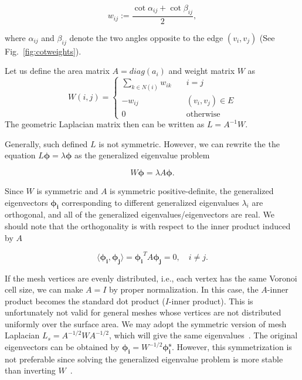 \begin{equation}
w_{ij}:=\frac{\cot\alpha_{ij}+\cot\beta_{ij}}{2},
\end{equation}

where $\alpha_{ij}$ and $\beta_{ij}$ denote the two angles opposite to the edge $(v_i,v_j)$
(See Fig.~\ref{fig:cotweights}).

Let us define the area matrix $A=diag(a_i)$ and weight matrix $W$ as
\begin{equation*}
W(i,j)=\left\{
       \begin{array}{lc}
        \sum_{k\in N(i)}w_{ik}\quad & i=j \\
        -w_{ij}\quad & (v_i,v_j)\in E \\
        0\quad & \text{otherwise}
    \end{array}
\right.
\end{equation*}
The geometric Laplacian matrix then can be written as $L=A^{-1}W$.

Generally, such defined $L$ is not symmetric. However, we can rewrite the the
equation $L\mathbf{\phi}=\lambda\mathbf{\phi}$ as the generalized eigenvalue
problem

\begin{equation}
\label{eq:geneigen}
W\mathbf{\phi}=\lambda A\mathbf{\phi}.
\end{equation}

Since $W$ is symmetric and $A$ is symmetric positive-definite, the generalized
eigenvectors $\mathbf{\phi_i}$ corresponding to different generalized eigenvalues
$\lambda_i$ are orthogonal, and all of the generalized eigenvalues/eigenvectors
are real. We should note that the orthogonality is with respect to the inner product
induced by $A$

\begin{equation}
\langle\mathbf{\phi_i},\mathbf{\phi_j}\rangle=\mathbf{\phi_i}^T A \mathbf{\phi_j}=0,\quad i\neq j.
\end{equation}

If the mesh vertices are evenly distributed, i.e., each vertex has the same Voronoi
cell size, we can make $A=I$ by proper normalization. In this case, the $A$-inner
product becomes the standard dot product ($I$-inner product). This is unfortunately
not valid for general meshes whose vertices are not distributed uniformly over the
surface area. We may adopt the symmetric version of mesh Laplacian $L_s = A^{-1/2}WA^{-1/2}$,
which will give the same eigenvalues~\cite{Vallet2008}. The original eigenvectors can be
obtained by $\mathbf{\phi_i}=W^{-1/2}\mathbf{\phi^s_i}$. However, this symmetrization is not
preferable since solving the generalized eigenvalue problem is more stable than
inverting $W$~\cite{Reuter:CG:2009}.

